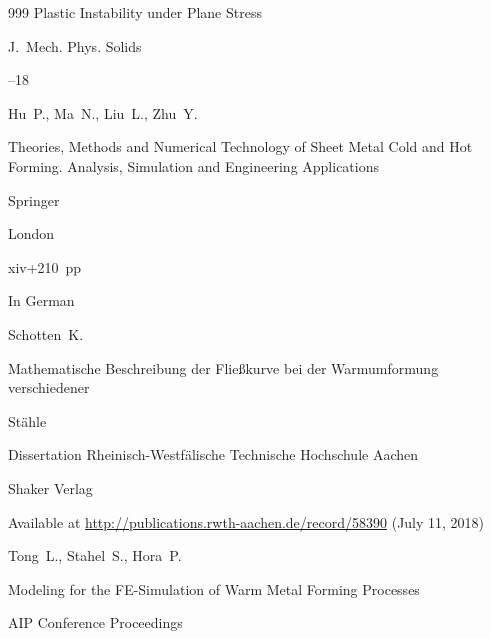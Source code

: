 \begin{thebibliography}{999}
\paper Plastic Instability under Plane Stress

\jour J.~Mech. Phys. Solids




--18





\by Hu~P., Ma~N., Liu~L., Zhu~Y. 

\book Theories, Methods and Numerical Technology of Sheet Metal Cold and Hot Forming. Analysis, Simulation and Engineering Applications


\publ Springer

\publaddr London

\totalpages xiv+210~pp \nofrills









\lang In German

\by Schotten~K.

\thesis Mathematische     Beschreibung     der     Flie{\ss}kurve   bei   der   Warmumformung   verschiedener   

St\"ahle

\thesisinfo Dissertation  Rheinisch-Westf\"alische  Technische  Hochschule Aachen

\publaddr Shaker Verlag 


\elink Available at \url{http://publications.rwth-aachen.de/record/58390} (July 11, 2018)








\by Tong~L., Stahel~S., Hora~P.

\paper Modeling for the FE-Simulation of Warm Metal Forming Processes

\jour AIP Conference Proceedings 





\end{thebibliography}
